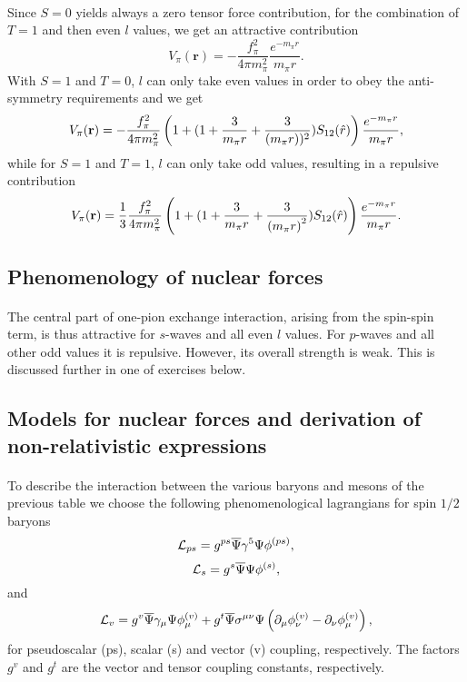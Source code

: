 \documentclass[%
twoside,                 %
final,                   %
10pt]{article}
\begin{document}
\paragraph{}
Since $S=0$ yields always a zero tensor force contribution, for the combination of $T=1$ and then even $l$ values, we get an attractive contribution
\[
V_{\pi}(\mathbf{r})=-\frac{f_{\pi}^{2}}{4\pi m_{\pi}^{2}}\frac{e^{-m_\pi r}}{m_\pi r}.
\]
With $S=1$ and $T=0$, $l$ can only take even values in order to obey the anti-symmetry requirements and we get
\[
V_{\pi}(\mathbf{r})= -\frac{f_{\pi}^{2}}{4\pi m_{\pi}^{2}}
\left(1+( 1 + {3\over m_\pi r} + {3\over\left(m_\pi r\right))^2}) S_{12} (\hat r)\right) \frac{e^{-m_\pi r}}{m_\pi r},
\]
while for $S=1$ and $T=1$, $l$ can only take odd values, resulting in a repulsive contribution 
\[
V_{\pi}(\mathbf{r})= \frac{1}{3}\frac{f_{\pi}^{2}}{4\pi m_{\pi}^{2}}\left(1+( 1 + {3\over m_\pi r} + {3\over\left(m_\pi r\right)^2}) S_{12} (\hat r)\right) \frac{e^{-m_\pi r}}{m_\pi r}.
\]



\subsection*{Phenomenology of nuclear forces}

\paragraph{}

The central part of one-pion exchange interaction, arising from the spin-spin term,  
is thus attractive for $s$-waves and all even $l$ values. For $p$-waves and all other odd values
it is repulsive. However, its overall strength is weak. This is discussed further in one of exercises below.





\subsection*{Models for nuclear forces and derivation of non-relativistic expressions}

\paragraph{}
To describe the interaction between the various baryons and mesons of the previous
table we choose the following phenomenological
lagrangians
for spin $1/2$ baryons
\[
   {\cal L}_{ps} =g^{ps}\overline{\Psi}\gamma^{5}
   \Psi\phi^{(ps)},
\]
\[
   {\cal L}_{s} =g^{s}\overline{\Psi}\Psi\phi^{(s)},
\]
and
\[
   {\cal L}_{v} =g^{v}\overline{\Psi}\gamma_{\mu}\Psi\phi_{\mu}^{(v)}
   +g^{t}\overline{\Psi}\sigma^{\mu\nu}\Psi\left
   (\partial_{\mu}\phi_{\nu}^{(v)}
   -\partial_{\nu}\phi_{\mu}^{(v)}\right),
\]
for pseudoscalar (ps), scalar (s) and vector (v) coupling, respectively.
The factors $g^{v}$ and $g^{t}$ are the vector
and tensor coupling constants, respectively.
\end{document}
